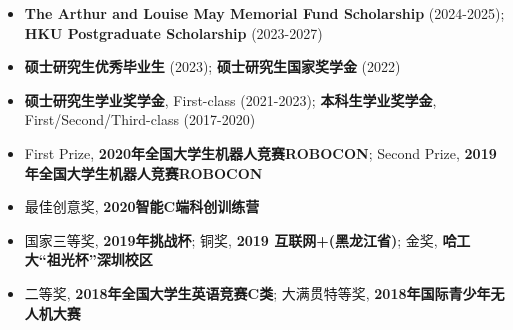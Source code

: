 %
%




\begin{itemize}
	\item{\textbf{The Arthur and Louise May Memorial Fund Scholarship} (2024-2025); \textbf{HKU Postgraduate Scholarship} (2023-2027)}
    \item{\textbf{硕士研究生优秀毕业生} (2023); \textbf{硕士研究生国家奖学金} (2022)}

    \item{\textbf{硕士研究生学业奖学金}, First-class (2021-2023); \textbf{本科生学业奖学金}, First/Second/Third-class (2017-2020)}
    
    \item{First Prize, \textbf{2020年全国大学生机器人竞赛ROBOCON}; Second Prize, \textbf{2019年全国大学生机器人竞赛ROBOCON}}
    \item {最佳创意奖, \textbf{2020智能C端科创训练营}}
    
    \item{国家三等奖, \textbf{2019年挑战杯}; 铜奖, \textbf{2019 互联网+(黑龙江省)}; 金奖, \textbf{哈工大“祖光杯”深圳校区}}
    
    \item{二等奖, \textbf{2018年全国大学生英语竞赛C类}; 大满贯特等奖, \textbf{2018年国际青少年无人机大赛}}
\end{itemize}

